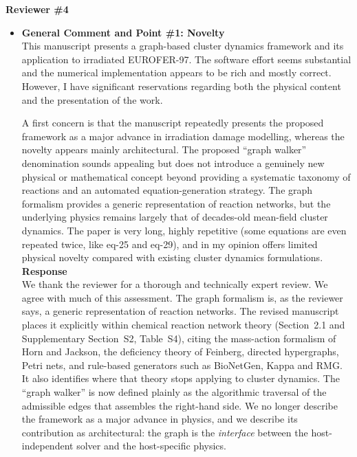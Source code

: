 \documentclass{article}
\begin{document}
\newpage
\noindent\textbf{Reviewer \#4}
\begin{itemize}
\item \textbf{General Comment and Point \#1: Novelty}\\
This manuscript presents a graph-based cluster dynamics framework and its application to irradiated EUROFER-97. The software effort seems substantial and the numerical implementation appears to be rich and mostly correct. However, I have significant reservations regarding both the physical content and the presentation of the work.

A first concern is that the manuscript repeatedly presents the proposed framework as a major advance in irradiation damage modelling, whereas the novelty appears mainly architectural. The proposed ``graph walker'' denomination sounds appealing but does not introduce a genuinely new physical or mathematical concept beyond providing a systematic taxonomy of reactions and an automated equation-generation strategy. The graph formalism provides a generic representation of reaction networks, but the underlying physics remains largely that of decades-old mean-field cluster dynamics. The paper is very long, highly repetitive (some equations are even repeated twice, like eq-25 and eq-29), and in my opinion offers limited physical novelty compared with existing cluster dynamics formulations.\\

\textbf{Response}\\
We thank the reviewer for a thorough and technically expert review. We agree with much of this assessment. The graph formalism is, as the reviewer says, a generic representation of reaction networks. The revised manuscript places it explicitly within chemical reaction network theory (Section~2.1 and Supplementary Section~S2, Table~S4), citing the mass-action formalism of Horn and Jackson, the deficiency theory of Feinberg, directed hypergraphs, Petri nets, and rule-based generators such as BioNetGen, Kappa and RMG. It also identifies where that theory stops applying to cluster dynamics. The ``graph walker'' is now defined plainly as the algorithmic traversal of the admissible edges that assembles the right-hand side. We no longer describe the framework as a major advance in physics, and we describe its contribution as architectural: the graph is the \emph{interface} between the host-independent solver and the host-specific physics.


\end{itemize}
\end{document}
